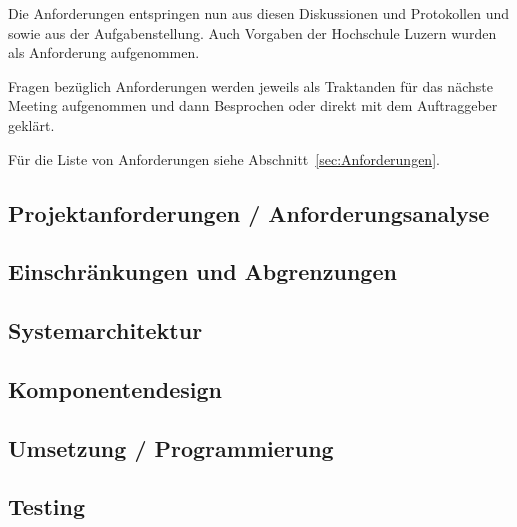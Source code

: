 Die Anforderungen entspringen nun aus diesen Diskussionen und Protokollen und sowie aus der Aufgabenstellung.
Auch Vorgaben der Hochschule Luzern wurden als Anforderung aufgenommen.

Fragen bezüglich Anforderungen werden jeweils als Traktanden für das nächste Meeting aufgenommen und dann Besprochen oder direkt mit dem Auftraggeber geklärt.

Für die Liste von Anforderungen siehe Abschnitt~\ref{sec:Anforderungen}.

\subsection{Projektanforderungen / Anforderungsanalyse}
\label{sub:Anforderungen}

\subsection{Einschränkungen und Abgrenzungen}


\subsection{Systemarchitektur}

\subsection{Komponentendesign}

\subsection{Umsetzung / Programmierung}

\subsection{Testing}
